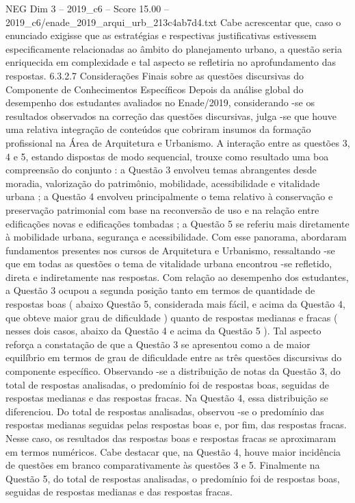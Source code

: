\begin{textsample}{NEG Dim 3 – 2019\_c6 – Score 15.00 – 2019\_c6/enade\_2019\_arqui\_urb\_213c4ab7d4.txt}
Cabe acrescentar que, caso o enunciado exigisse que as estratégias e respectivas justificativas estivessem especificamente relacionadas ao âmbito do planejamento urbano, a questão seria enriquecida em complexidade e tal aspecto se refletiria no aprofundamento das respostas. 6.3.2.7 Considerações Finais sobre as questões discursivas do Componente de Conhecimentos Específicos Depois da análise global do desempenho dos estudantes avaliados no Enade/2019, considerando -se os resultados observados na correção das questões discursivas, julga -se que houve uma relativa integração de conteúdos que cobriram insumos da formação profissional na Área de Arquitetura e Urbanismo.
A interação entre as questões 3, 4 e 5, estando dispostas de modo sequencial, trouxe como resultado uma boa compreensão do conjunto : a Questão 3 envolveu temas abrangentes desde moradia, valorização do patrimônio, mobilidade, acessibilidade e vitalidade urbana ; a Questão 4 envolveu principalmente o tema relativo à conservação e preservação patrimonial com base na reconversão de uso e na relação entre edificações novas e edificações tombadas ; a Questão 5 se referiu mais diretamente à mobilidade urbana, segurança e acessibilidade.
Com esse panorama, abordaram fundamentos presentes nos cursos de Arquitetura e Urbanismo, ressaltando -se que em todas as questões o tema de vitalidade urbana encontrou -se refletido, direta e indiretamente nas respostas.
Com relação ao desempenho dos estudantes, a Questão 3 ocupou a segunda posição tanto em termos de quantidade de respostas boas ( abaixo Questão 5, considerada mais fácil, e acima da Questão 4, que obteve maior grau de dificuldade ) quanto de respostas medianas e fracas ( nesses dois casos, abaixo da Questão 4 e acima da Questão 5 ).
Tal aspecto reforça a constatação de que a Questão 3 se apresentou como a de maior equilíbrio em termos de grau de dificuldade entre as três questões discursivas do componente específico.
Observando -se a distribuição de notas da Questão 3, do total de respostas analisadas, o predomínio foi de respostas boas, seguidas de respostas medianas e das respostas fracas.
Na Questão 4, essa distribuição se diferenciou.
Do total de respostas analisadas, observou -se o predomínio das respostas medianas seguidas pelas respostas boas e, por fim, das respostas fracas.
Nesse caso, os resultados das respostas boas e respostas fracas se aproximaram em termos numéricos.
Cabe destacar que, na Questão 4, houve maior incidência de questões em branco comparativamente às questões 3 e 5.
Finalmente na Questão 5, do total de respostas analisadas, o predomínio foi de respostas boas, seguidas de respostas medianas e das respostas fracas.

\end{textsample}
